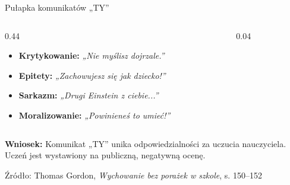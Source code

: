 \documentclass[10pt, aspectratio=169]{beamer}
\begin{document}
\begin{frame}{Pułapka komunikatów „TY”}
\begin{columns}[T]
\begin{column}{0.44\textwidth}
            \vspace{0.15cm}
            \begin{itemize}
                \footnotesize
                \setlength{\itemsep}{4pt}
                \item \textbf{Krytykowanie:} \textit{„Nie myślisz dojrzale.”}
                \item \textbf{Epitety:} \textit{„Zachowujesz się jak dziecko!”}
                \item \textbf{Sarkazm:} \textit{„Drugi Einstein z ciebie...”}
                \item \textbf{Moralizowanie:} \textit{„Powinieneś to umieć!”}
            \end{itemize}
        \end{column}
        
        \begin{column}{0.04\textwidth}\end{column}
    \end{columns}
    
    \vspace{0.5cm}
    \pause
    \begin{center}
        \footnotesize \textbf{\textcolor{accentCoral}{Wniosek:}} Komunikat „TY” unika odpowiedzialności za uczucia nauczyciela.\\Uczeń jest wystawiony na publiczną, negatywną ocenę.
        
        \vspace{0.25cm}
        \scriptsize\textcolor{textMuted}{Źródło: Thomas Gordon, \textit{Wychowanie bez porażek w szkole}, s. 150–152}
    \end{center}
\end{frame}
\end{document}
